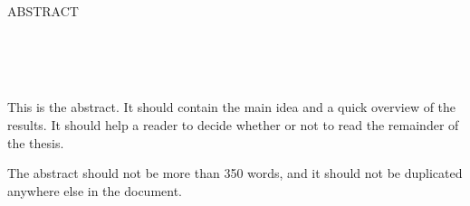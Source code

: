 \documentclass[main.tex]{subfiles}
\begin{document}
\newpage
\doublespacing

\begin{center}
ABSTRACT\\

\yourtitle \\
\yourname \\
\number\year\\
\end{center}

\par
This is the abstract.  It should contain the main idea and a quick overview of the
results.  It should help a reader to decide whether or not to read the remainder
of the thesis.

The abstract should not be more than 350 words, and it should not be duplicated
anywhere else in the document.
\end{document}
